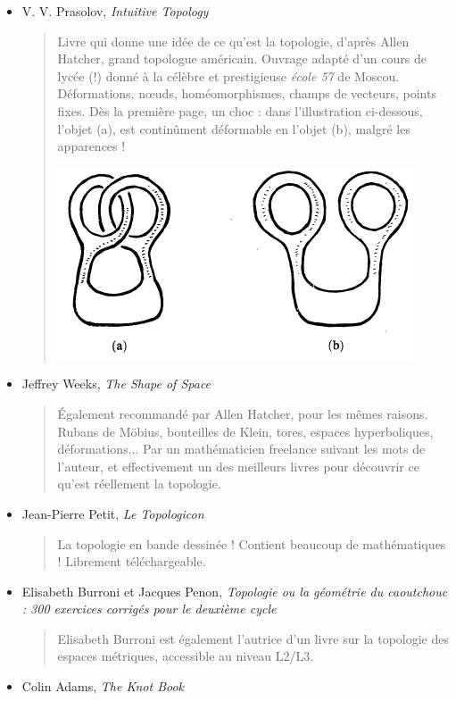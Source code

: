 \documentclass{article}
\begin{document}
\newpage
\begin{itemize}
\item V. V. Prasolov, \emph{Intuitive Topology}
\begin{quote}
Livre qui \og donne une idée de ce qu'est la topologie\fg, d'après Allen Hatcher, grand topologue américain.  Ouvrage adapté d'un cours de lycée (!) donné à la célèbre et prestigieuse  \emph{école 57} de Moscou. Déformations, n\oe uds, homéomorphismes, champs de vecteurs, points fixes. Dès la première page, un choc : dans l'illustration ci-dessous, l'objet (a), est continûment déformable en l'objet (b), malgré les apparences !
\begin{center}
\includegraphics[scale=.6]{enlacement}
\end{center}
\end{quote}
\item Jeffrey Weeks, \emph{The Shape of Space}
\begin{quote}
Également recommandé par Allen Hatcher, pour les mêmes raisons. Rubans de Möbius, bouteilles de Klein, tores, espaces hyperboliques, déformations... Par un \og mathématicien freelance\fg{} suivant les mots de l'auteur, et effectivement un des meilleurs livres pour découvrir ce qu'est réellement la topologie.
\end{quote}
\item Jean-Pierre Petit, \emph{Le Topologicon}
\begin{quote}
La topologie en bande dessinée ! Contient beaucoup de mathématiques ! Librement téléchargeable. 
\end{quote}
\item  Elisabeth Burroni et Jacques Penon, \emph{Topologie ou la géométrie du caoutchouc : 300 exercices corrigés pour le deuxième cycle}
\begin{quote}
Elisabeth Burroni est également l'autrice d'un livre sur la topologie des espaces métriques, accessible au niveau L2/L3.
\end{quote}
\item Colin Adams, \emph{The Knot Book}

\end{itemize}
\end{document}
